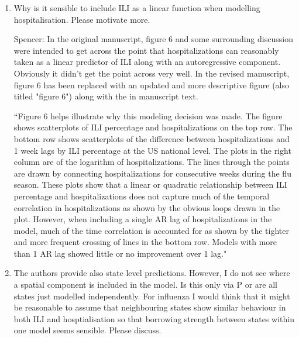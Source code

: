 \documentclass{article}
\newcommand{\spencer}[1]{{\color{blue} Spencer: #1}}
\begin{document}
\begin{enumerate}[1.]
\spencer{In the revised manuscript, 
both the simulation study and the real data analysis were updated to include
comparison of our models to others. In the simulation study, we included out 
of the box methods including an ARIMA model and a random walk baseline model
(similar to the baseline used in the FluSight competition).
In the real data analysis, our model forecasts are compared to those of 20
non-ensemble models submitted to the FluSight competition during the 2023-24
season. In both the simulation study and the real data analysis, 
our models show very good performance when compared to the other models. 
The original real data analysis where we compare several models that
belong to our framework is now in the supplementary materials.}

\item Why is it sensible to include ILI as a linear function when modelling 
hospitalisation. Please motivate more. 

\spencer{In the original manuscript, figure 6 and some surrounding discussion
were intended to get across the point that hospitalizations can reasonably
taken as a linear predictor of ILI along with an autoregressive component.
Obviously it didn't get the point across very well. 
In the revised manuscript, figure 6 has been replaced with an updated and more
descriptive figure (also titled "figure 6") along with the in manuscript
text.

``Figure 6 helps
illustrate why this modeling decision was made.
The figure shows scatterplots of ILI percentage and 
hospitalizations on the top row.
The bottom row shows scatterplots of the difference between hospitalizations and 
1 week 
lags
by ILI percentage at the US national level. The plots in the right column
are of the logarithm of hospitalizations. The lines through the points are
drawn by connecting hospitalizations for consecutive weeks during the flu 
season.
These plots show that a linear or quadratic relationship between ILI percentage 
and hospitalizations does not capture much of the temporal correlation in 
hospitalizations as shown by the obvious loops drawn in the plot. 
However, when including a 
single AR lag of hospitalizations in the model, much of the time 
correlation is
accounted for as shown by the tighter and more frequent crossing of lines
in the bottom row. Models with more than 1 AR lag showed little or no 
improvement over 1 lag."}

\item The authors provide also state level predictions. However, I do not see 
where a spatial component is included in the model. Is this only via P or are 
all states just modelled independently. For influenza I would think that it 
might be reasonable to assume that neighbouring states show similar behaviour 
in both ILI and hosptialisation so that borrowing strength between states 
within one model seems sensible. Please discuss.



\end{enumerate}
\end{document}
